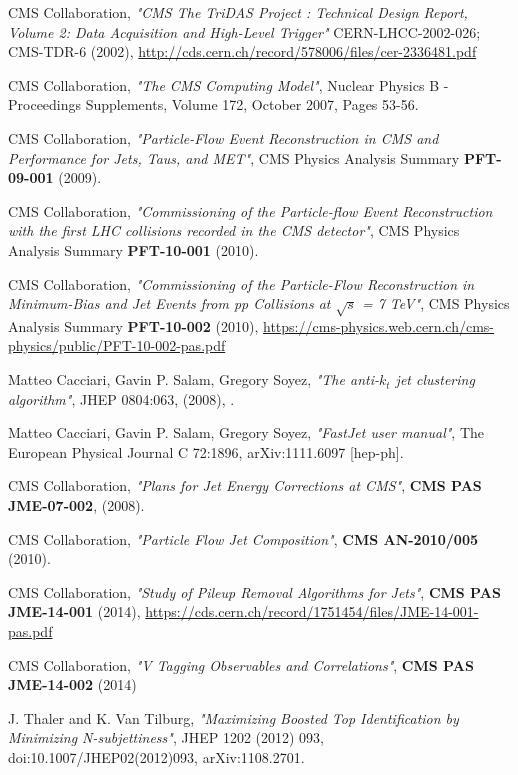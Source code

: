 \documentclass[a4paper,12pt,oneside]{report}
\begin{document}
\begin{thebibliography}{9}
  CMS Collaboration,
  \emph{"CMS The TriDAS Project : Technical Design Report, Volume 2: Data Acquisition and High-Level Trigger"}
   CERN-LHCC-2002-026; CMS-TDR-6 (2002), 
   \url{http://cds.cern.ch/record/578006/files/cer-2336481.pdf}
   

  CMS Collaboration,
  \emph{"The CMS Computing Model"}, Nuclear Physics B - Proceedings Supplements, Volume 172, October 2007, Pages 53-56.

CMS Collaboration,
\emph{"Particle-Flow Event Reconstruction in CMS and
Performance for Jets, Taus, and MET"}, CMS Physics Analysis Summary
\textbf{PFT-09-001} (2009).

CMS Collaboration,
\emph{"Commissioning of the Particle-flow Event
Reconstruction with the first LHC collisions recorded in the CMS detector"},
CMS Physics Analysis Summary
\textbf{PFT-10-001} (2010).

CMS Collaboration,
\emph{"Commissioning of the Particle-Flow Reconstruction in
Minimum-Bias and Jet Events from pp Collisions at $\sqrt{s}$ = 7 TeV"},
CMS Physics Analysis Summary
\textbf{PFT-10-002} (2010),
\url{https://cms-physics.web.cern.ch/cms-physics/public/PFT-10-002-pas.pdf}

Matteo Cacciari, Gavin P. Salam, Gregory Soyez,
\emph{"The anti-$k_{t}$ jet clustering algorithm"},
JHEP 0804:063, (2008), .

Matteo Cacciari, Gavin P. Salam, Gregory Soyez,
\emph{"FastJet user manual"},
The European Physical Journal C 72:1896, arXiv:1111.6097 [hep-ph].  

CMS Collaboration,
\emph{"Plans for Jet Energy Corrections at CMS"},
\textbf{CMS PAS JME-07-002}, (2008).

CMS Collaboration,
\emph{"Particle Flow Jet Composition"},
\textbf{CMS AN-2010/005} (2010).    

CMS Collaboration,
\emph{"Study of Pileup Removal Algorithms for Jets"},
\textbf{CMS PAS JME-14-001} (2014),
\url{https://cds.cern.ch/record/1751454/files/JME-14-001-pas.pdf}

CMS Collaboration,
\emph{"V Tagging Observables and Correlations"},
\textbf{CMS PAS JME-14-002} (2014)

J. Thaler and K. Van Tilburg,
\emph{"Maximizing Boosted Top Identification by Minimizing
N-subjettiness"},
JHEP 1202 (2012) 093, doi:10.1007/JHEP02(2012)093, arXiv:1108.2701.


\end{thebibliography}
\end{document}
